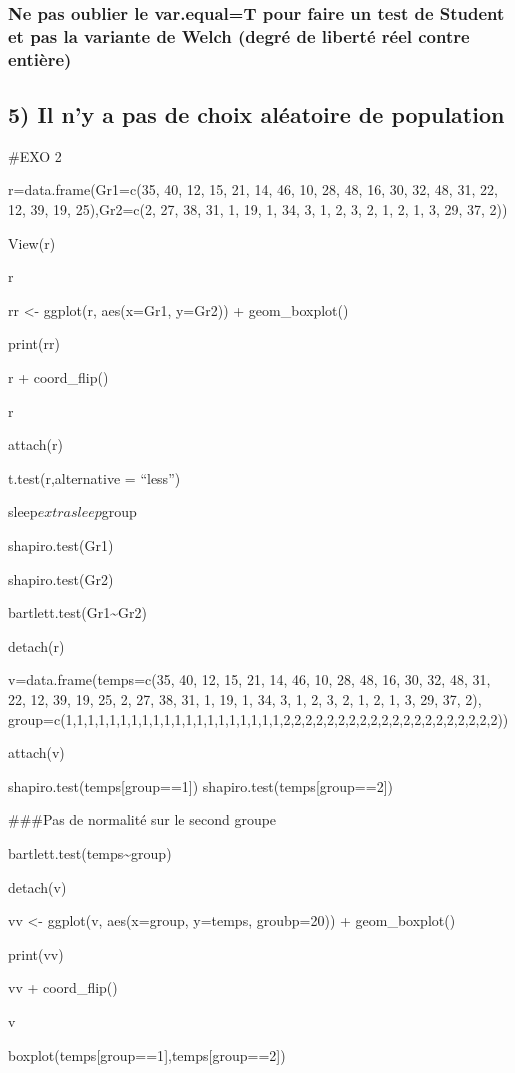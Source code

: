 \documentclass[
]{article}
\begin{document}
\hypertarget{ne-pas-oublier-le-var.equalt-pour-faire-un-test-de-student-et-pas-la-variante-de-welch-degruxe9-de-libertuxe9-ruxe9el-contre-entiuxe8re}{%
\subsubsection{Ne pas oublier le var.equal=T pour faire un test de
Student et pas la variante de Welch (degré de liberté réel contre
entière)}\label{ne-pas-oublier-le-var.equalt-pour-faire-un-test-de-student-et-pas-la-variante-de-welch-degruxe9-de-libertuxe9-ruxe9el-contre-entiuxe8re}}

\hypertarget{il-ny-a-pas-de-choix-aluxe9atoire-de-population}{%
\subsection{5) Il n'y a pas de choix aléatoire de
population}\label{il-ny-a-pas-de-choix-aluxe9atoire-de-population}}

\#EXO 2

r=data.frame(Gr1=c(35, 40, 12, 15, 21, 14, 46, 10, 28, 48, 16, 30, 32,
48, 31, 22, 12, 39, 19, 25),Gr2=c(2, 27, 38, 31, 1, 19, 1, 34, 3, 1, 2,
3, 2, 1, 2, 1, 3, 29, 37, 2))

View(r)

r

rr \textless- ggplot(r, aes(x=Gr1, y=Gr2)) + geom\_boxplot()

print(rr)

r + coord\_flip()

r

attach(r)

t.test(r,alternative = ``less'')

sleep\(extra sleep\)group

shapiro.test(Gr1)

shapiro.test(Gr2)

bartlett.test(Gr1\textasciitilde Gr2)

detach(r)

v=data.frame(temps=c(35, 40, 12, 15, 21, 14, 46, 10, 28, 48, 16, 30, 32,
48, 31, 22, 12, 39, 19, 25, 2, 27, 38, 31, 1, 19, 1, 34, 3, 1, 2, 3, 2,
1, 2, 1, 3, 29, 37, 2),
group=c(1,1,1,1,1,1,1,1,1,1,1,1,1,1,1,1,1,1,1,1,2,2,2,2,2,2,2,2,2,2,2,2,2,2,2,2,2,2,2,2))

attach(v)

shapiro.test(temps{[}group==1{]}) shapiro.test(temps{[}group==2{]})

\#\#\#Pas de normalité sur le second groupe

bartlett.test(temps\textasciitilde group)

detach(v)

vv \textless- ggplot(v, aes(x=group, y=temps, groubp=20)) +
geom\_boxplot()

print(vv)

vv + coord\_flip()

v

boxplot(temps{[}group==1{]},temps{[}group==2{]})
\end{document}

